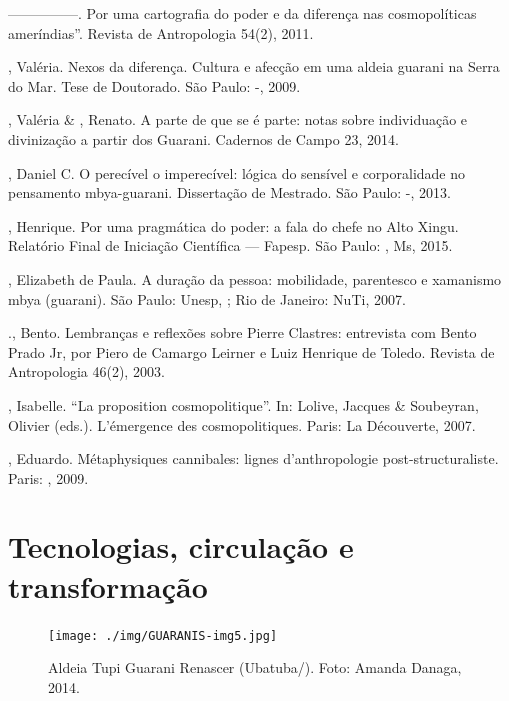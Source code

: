 \begin{Parskip}
—————. Por uma cartografia do poder e da diferença nas cosmopolíticas
ameríndias''. Revista de Antropologia 54(2), 2011. 

, Valéria. Nexos da diferença. Cultura e afecção em uma aldeia
guarani na Serra do Mar. Tese de Doutorado. São Paulo: -, 2009.

, Valéria \& , Renato. A parte de que se é parte: notas
sobre individuação e divinização a partir dos Guarani. Cadernos de
Campo 23, 2014.

, Daniel C. O perecível o imperecível: lógica do sensível e
corporalidade no pensamento mbya-guarani. Dissertação de Mestrado. São
Paulo: -, 2013.

, Henrique. Por uma pragmática do poder: a fala do chefe no Alto
Xingu. Relatório Final de Iniciação Científica — Fapesp. São Paulo:
, Ms, 2015. 

, Elizabeth de Paula. A duração da pessoa: mobilidade,
parentesco e xamanismo mbya (guarani). São Paulo: Unesp, ; Rio de
Janeiro: NuTi, 2007.

 ., Bento. Lembranças e reflexões sobre Pierre Clastres:
entrevista com Bento Prado Jr, por Piero de Camargo Leirner e Luiz
Henrique de Toledo. Revista de Antropologia 46(2), 2003.  

, Isabelle. ``La proposition cosmopolitique''. In: Lolive, Jacques
\& Soubeyran, Olivier (eds.). L’émergence des cosmopolitiques. Paris:
La Découverte, 2007.

  , Eduardo. Métaphysiques cannibales: lignes
d’anthropologie post-structuraliste. Paris: , 2009.
\end{Parskip}

\part{Tecnologias, circulação e transformação}

\begin{figure}
  \centering
 \texttt{[image: ./img/GUARANIS-img5.jpg]}	
  \hfill
  \caption{Aldeia Tupi Guarani Renascer (Ubatuba/). Foto: Amanda Danaga, 2014.}
\end{figure}

 


